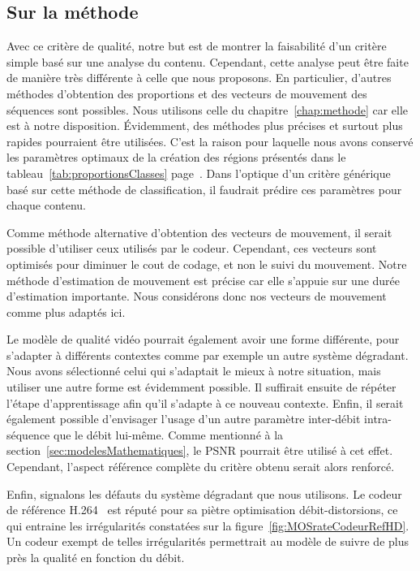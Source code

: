 \subsection{Sur la méthode}
Avec ce critère de qualité, notre but est de montrer la faisabilité d'un critère simple basé sur une analyse du contenu. Cependant, cette analyse peut être faite de manière très différente à celle que nous proposons. En particulier, d'autres méthodes d'obtention des proportions et des vecteurs de mouvement des séquences sont possibles. Nous utilisons celle du chapitre~\ref{chap:methode} car elle est à notre disposition. Évidemment, des méthodes plus précises et surtout plus rapides pourraient être utilisées. C'est la raison pour laquelle nous avons conservé les paramètres optimaux de la création des régions présentés dans le tableau~\ref{tab:proportionsClasses} page~\pageref{tab:proportionsClasses}. Dans l'optique d'un critère générique basé sur cette méthode de classification, il faudrait prédire ces paramètres pour chaque contenu.

Comme méthode alternative d'obtention des vecteurs de mouvement, il serait possible d'utiliser ceux utilisés par le codeur. Cependant, ces vecteurs sont optimisés pour diminuer le cout de codage, et non le suivi du mouvement. Notre méthode d'estimation de mouvement est précise car elle s'appuie sur une durée d'estimation importante. Nous considérons donc nos vecteurs de mouvement comme plus adaptés ici.

Le modèle de qualité vidéo pourrait également avoir une forme différente, pour s'adapter à différents contextes comme par exemple un autre système dégradant. Nous avons sélectionné celui qui s'adaptait le mieux à notre situation, mais utiliser une autre forme est évidemment possible. Il suffirait ensuite de répéter l'étape d'apprentissage afin qu'il s'adapte à ce nouveau contexte. Enfin, il serait également possible d'envisager l'usage d'un autre paramètre inter-débit intra-séquence que le débit lui-même. Comme mentionné à la section~\ref{sec:modelesMathematiques}, le PSNR pourrait être utilisé à cet effet. Cependant, l'aspect référence complète du critère obtenu serait alors renforcé.

Enfin, signalons les défauts du système dégradant que nous utilisons. Le codeur de référence H.264~\cite{h264-jm} est réputé pour sa piètre optimisation débit-distorsions, ce qui entraine les irrégularités constatées sur la figure~\ref{fig:MOSrateCodeurRefHD}. Un codeur exempt de telles irrégularités permettrait au modèle de suivre de plus près la qualité en fonction du débit.


